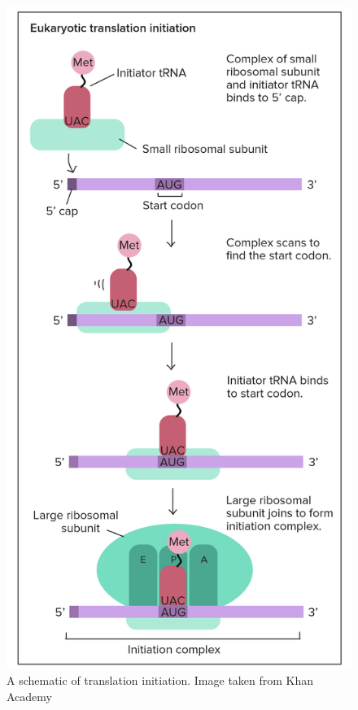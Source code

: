 \begin{figure}
    \centering
    \includegraphics[scale=0.8]{translation_initiation.png}
    \caption{A schematic of translation initiation. Image taken from Khan Academy \cite{khan}}
    \label{image_2}
\end{figure}